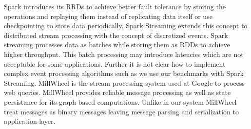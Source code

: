 Spark\cite{zaharia2010spark} introduces its RRDs\cite{zaharia2012resilient} to achieve better fault tolerance by storing the operations and replaying them instead of replicating data itself or use checkpointing to store data periodically. Spark Streaming\cite{zaharia2013discretized} extends this concept to distributed stream processing with the concept of discretized events. Spark streaming\cite{zaharia2013discretized} processes data as batches while storing them as RDDs \cite{zaharia2012resilient} to achieve higher throughput. This batch processing may introduce latencies which are not acceptable for some applications. Further it is not clear how to implement complex event processing algorithms such as we use our benchmarks with Spark Streaming. MillWheel\cite{akidau2013millwheel} is the stream processing system used at Google to process web queries. MillWheel\cite{akidau2013millwheel} provides reliable message processing as well as state persistance for its graph based computations. Unlike in our system MillWheel treat messages as binary 
messages leaving message parsing and serialization to application layer. 
